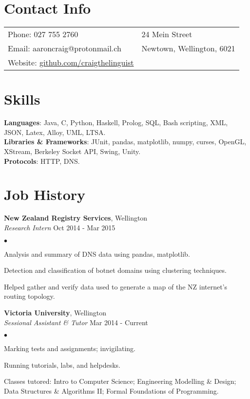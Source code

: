 \documentclass[margin,line]{res}
\newenvironment{list2}{
  \begin{list}{$\bullet$}{%
      \setlength{\itemsep}{0in}
      \setlength{\parsep}{0in} \setlength{\parskip}{0in}
      \setlength{\topsep}{0in} \setlength{\partopsep}{0in}
      \setlength{\leftmargin}{0.2in}}}
  {\end{list}}
\begin{document}
\begin{resume}

  \section{\sc Contact Info}
    \vspace{.05in}
    \begin{tabular}{@{}p{3.5in}p{3in}}
      {Phone}: 027 755 2760 & 24 Mein Street \\
      {Email}: aaroncraig@protonmail.ch & Newtown, Wellington, 6021 \\
      {Website}: \url{github.com/craigthelinguist}
    \end{tabular}

   \section{\sc Skills}
    {\bf Languages}: Java, C, Python, Haskell, Prolog, SQL, Bash scripting, XML, JSON, Latex, Alloy, UML, LTSA.\\
    {\bf Libraries \& Frameworks}: JUnit, pandas, matplotlib, numpy, curses, OpenGL, XStream, Berkeley Socket API, Swing, Unity.\\
    {\bf Protocols}: HTTP, DNS.

  \section{\sc Job History}
  
    {\bf New Zealand Registry Services}, Wellington\\
    {\em Research Intern} \hfill {Oct 2014 - Mar 2015}
    \begin{list2}
	\item Analysis and summary of DNS data using pandas, matplotlib.
	\item Detection and classification of botnet domains using clustering techniques.
	\item Helped gather and verify data used to generate a map of the NZ internet's routing topology.
    \end{list2}

    {\bf Victoria University}, Wellington\\
    {\em Sessional Assistant \& Tutor} \hfill {Mar 2014 - Current}
    \begin{list2}
	\item Marking tests and assignments; invigilating.
	\item Running tutorials, labs, and helpdesks.
	\item Classes tutored: Intro to Computer Science; Engineering Modelling \& Design; Data Structures \& Algorithms 				II; Formal Foundations of Programming.
    \end{list2}


\end{resume}
\end{document}
